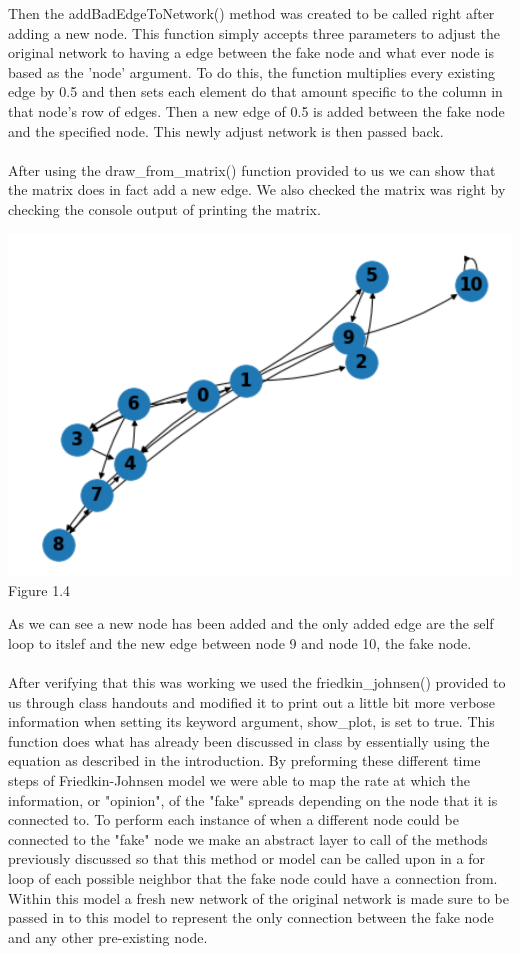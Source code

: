 \documentclass[letterpaper]{article}
\begin{document}
Then the addBadEdgeToNetwork() method was created to be called right after adding a new node.  This function simply accepts three parameters to adjust the original network to having a edge between the fake node and what ever node is based as the 'node' argument.  To do this, the function multiplies every existing edge by 0.5 and then sets each element do that amount specific to the column in that node's row of edges.  Then a new edge of 0.5 is added between the fake node and the specified node.  This newly adjust network is then passed back.\\\\
After using the draw\_from\_matrix() function provided to us we can show that the matrix does in fact add a new edge.  We also checked the matrix was right by checking the console output of printing the matrix. \\
\begin{center}
	\includegraphics[scale=0.6]{./Images/Figure1.4} \\
	Figure 1.4
\end{center}
As we can see a new node has been added and the only added edge are the self loop to itslef and the new edge between node 9 and node 10, the fake node.\\\\
After verifying that this was working we used the friedkin\_johnsen() provided to us through class handouts and modified it to print out a little bit more verbose information when setting its keyword argument, show\_plot, is set to true.  This function does what has already been discussed in class by essentially using the equation as described in the introduction.  By preforming these different time steps of Friedkin-Johnsen model we were able to map the rate at which the information, or "opinion", of the "fake" spreads depending on the node that it is connected to. To perform each instance of when a different node could be connected to the "fake" node we make an abstract layer to call of the methods previously discussed so that this method or model can be called upon in a for loop of each possible neighbor that the fake node could have a connection from.  Within this model a fresh new network of the original network is made sure to be passed in to this model to represent the only connection between the fake node and any other pre-existing node.\\
\end{document}
